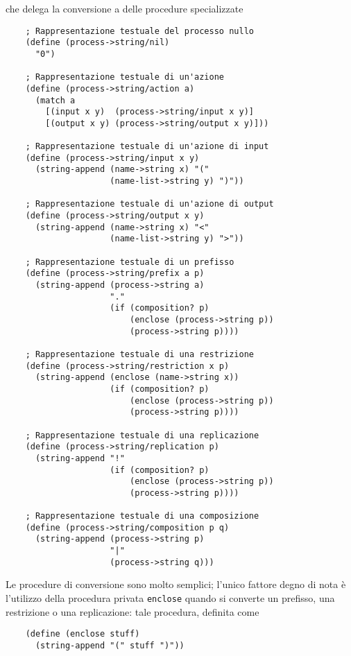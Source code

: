 che delega la conversione a delle procedure specializzate

\begin{lstlisting}
    ; Rappresentazione testuale del processo nullo
    (define (process->string/nil)
      "0")

    ; Rappresentazione testuale di un'azione
    (define (process->string/action a)
      (match a
        [(input x y)  (process->string/input x y)] 
        [(output x y) (process->string/output x y)]))

    ; Rappresentazione testuale di un'azione di input
    (define (process->string/input x y)
      (string-append (name->string x) "(" 
                     (name-list->string y) ")"))

    ; Rappresentazione testuale di un'azione di output
    (define (process->string/output x y)
      (string-append (name->string x) "<" 
                     (name-list->string y) ">"))

    ; Rappresentazione testuale di un prefisso
    (define (process->string/prefix a p)
      (string-append (process->string a)
                     "." 
                     (if (composition? p)
                         (enclose (process->string p)) 
                         (process->string p))))

    ; Rappresentazione testuale di una restrizione
    (define (process->string/restriction x p)
      (string-append (enclose (name->string x)) 
                     (if (composition? p)
                         (enclose (process->string p)) 
                         (process->string p))))

    ; Rappresentazione testuale di una replicazione
    (define (process->string/replication p)
      (string-append "!"
                     (if (composition? p)
                         (enclose (process->string p))
                         (process->string p))))

    ; Rappresentazione testuale di una composizione
    (define (process->string/composition p q)
      (string-append (process->string p)
                     "|"
                     (process->string q)))
\end{lstlisting}

Le procedure di conversione sono molto semplici; l'unico fattore degno
di nota \`e l'utilizzo della procedura privata \lstinline{enclose} quando
si converte un prefisso, una restrizione o una replicazione: tale
procedura, definita come

\begin{lstlisting}
    (define (enclose stuff)
      (string-append "(" stuff ")"))
\end{lstlisting}

